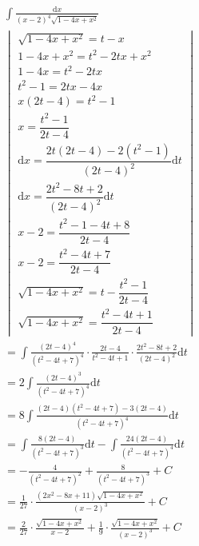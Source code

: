 
\begin{gather*}
\int{\frac{\mbox{d}x}{(x-2)^4\sqrt{1-4x+x^2}}}\\
\begin{vmatrix}
  \sqrt{1-4x+x^2}=t-x\\
  1-4x+x^2=t^2-2tx+x^2\\
  1-4x=t^2-2tx\\
  t^2-1=2tx-4x\\
  x(2t-4)=t^2-1\\
  x=\dfrac{t^2-1}{2t-4}\\
  \mbox{d}x=\dfrac{2t(2t-4)-2(t^2-1)}{(2t-4)^2}\mbox{d}t\\
  \mbox{d}x=\dfrac{2t^2-8t+2}{(2t-4)^2}\mbox{d}t\\
  x-2=\dfrac{t^2-1-4t+8}{2t-4}\\
  x-2=\dfrac{t^2-4t+7}{2t-4}\\
  \sqrt{1-4x+x^2}=t-\dfrac{t^2-1}{2t-4}\\
  \sqrt{1-4x+x^2}=\dfrac{t^2-4t+1}{2t-4}
\end{vmatrix} \\
= \int{\frac{(2t-4)^4}{(t^2-4t+7)^4}\cdot\frac{2t-4}{t^2-4t+1}\cdot\frac{2t^2-8t+2}{(2t-4)^2}\mbox{d}t}\\
= 2\int{\frac{(2t-4)^3}{(t^2-4t+7)^4}\mbox{d}t}\\
= 8\int{\frac{(2t-4)(t^2-4t+7)-3(2t-4)}{(t^2-4t+7)^4}\mbox{d}t}\\
= \int{\frac{8(2t-4)}{(t^2-4t+7)^3}\mbox{d}t}-\int{\frac{24(2t-4)}{(t^2-4t+7)^4}\mbox{d}t}\\
= -\frac{4}{(t^2-4t+7)^2}+\frac{8}{(t^2-4t+7)^3}+C\\
= \frac{1}{27} \cdot \frac{(2x^2-8x+11)\sqrt{1-4x+x^2}}{(x-2)^3}+C\\
= \frac{2}{27} \cdot \frac{\sqrt{1-4x+x^2}}{x-2}+\frac{1}{9} \cdot \frac{\sqrt{1-4x+x^2}}{(x-2)^3}+C
\end{gather*}
